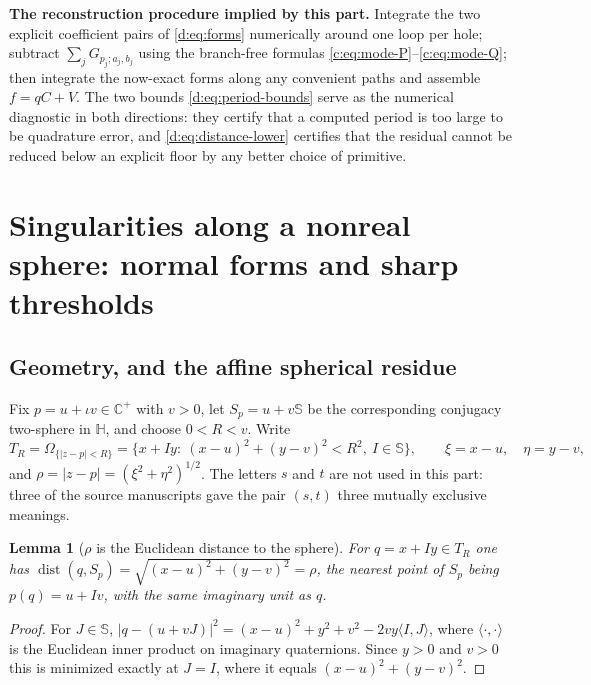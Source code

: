 \documentclass[11pt,a4paper]{article}
\numberwithin{equation}{section}
\newtheorem{lemma}[theorem]{Lemma}
\theoremstyle{definition}
\theoremstyle{remark}
\theoremstyle{plain}
\newcommand{\HH}{\mathbb H}
\newcommand{\CC}{\mathbb C}
\newcommand{\SSS}{\mathbb S}
\newcommand{\Cplus}{\CC^{+}}
\newcommand{\Om}{\Omega}
\newcommand{\pot}{C}          %
\newcommand{\potV}{V}         %
\newcommand{\Sp}{S_{p}}
\newcommand{\Tube}{T}
\newcommand{\abs}[1]{\lvert #1\rvert}
\begin{document}
\medskip
\noindent\textbf{The reconstruction procedure implied by this part.}
Integrate the two explicit coefficient pairs of \eqref{d:eq:forms}
numerically around one loop per hole; subtract
$\sum_jG_{p_j;a_j,b_j}$ using the branch-free formulas
\eqref{c:eq:mode-P}--\eqref{c:eq:mode-Q};
then integrate the now-exact forms along any convenient paths and assemble
$f=q\pot+\potV$.  The two bounds \eqref{d:eq:period-bounds} serve as the
numerical diagnostic in both directions: they certify that a computed
period is too large to be quadrature error, and
\eqref{d:eq:distance-lower} certifies that the residual cannot be reduced
below an explicit floor by any better choice of primitive.


\section{Singularities along a nonreal sphere: normal forms and sharp
thresholds}
\label{d:sec:singularities}

\subsection{Geometry, and the affine spherical residue}

Fix $p=u+\iota v\in\Cplus$ with $v>0$, let $\Sp=u+v\SSS$ be the
corresponding conjugacy two-sphere in $\HH$, and choose $0<R<v$.  Write
\begin{equation}
 \Tube_R=\Om_{\{\abs{z-p}<R\}}
 =\bigl\{x+Iy:\ (x-u)^2+(y-v)^2<R^2,\ I\in\SSS\bigr\},
 \qquad
 \xi=x-u,\quad \eta=y-v,
 \label{d:eq:tube}
\end{equation}
and $\rho=\abs{z-p}=(\xi^2+\eta^2)^{1/2}$.  The letters $s$ and $t$ are not
used in this part: three of the source manuscripts gave the pair $(s,t)$
three mutually exclusive meanings.

\begin{lemma}[$\rho$ is the Euclidean distance to the sphere]
\label{d:lem:distance}
For $q=x+Iy\in\Tube_R$ one has
$\operatorname{dist}(q,\Sp)=\sqrt{(x-u)^2+(y-v)^2}=\rho$, the nearest point
of $\Sp$ being $p(q)=u+Iv$, with the \emph{same} imaginary unit as $q$.
\end{lemma}

\begin{proof}
For $J\in\SSS$, $\abs{q-(u+vJ)}^2=(x-u)^2+y^2+v^2-2vy\langle I,J\rangle$,
where $\langle\cdot,\cdot\rangle$ is the Euclidean inner product on
imaginary quaternions.  Since $y>0$ and $v>0$ this is minimized exactly at
$J=I$, where it equals $(x-u)^2+(y-v)^2$.
\end{proof}
\end{document}

